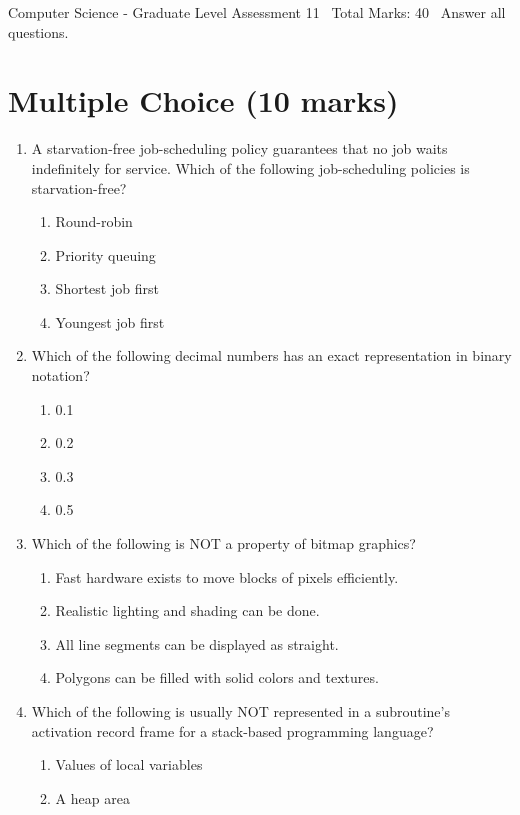 \documentclass[12pt]{article}
\begin{document}
\begin{center}
Computer Science - Graduate Level Assessment 11 \
Total Marks: 40 \
Answer all questions.
\end{center}

\section*{Multiple Choice (10 marks)}
\begin{enumerate}[label=\arabic*.]
\item A starvation-free job-scheduling policy guarantees that no job waits indefinitely for service. Which of the following job-scheduling policies is starvation-free?
\begin{enumerate}[label=(\alph*)]
    \item Round-robin
    \item Priority queuing
    \item Shortest job first
    \item Youngest job first
\end{enumerate}
\item Which of the following decimal numbers has an exact representation in binary notation?
\begin{enumerate}[label=(\alph*)]
    \item 0.1
    \item 0.2
    \item 0.3
    \item 0.5
\end{enumerate}
\item Which of the following is NOT a property of bitmap graphics?
\begin{enumerate}[label=(\alph*)]
    \item Fast hardware exists to move blocks of pixels efficiently.
    \item Realistic lighting and shading can be done.
    \item All line segments can be displayed as straight.
    \item Polygons can be filled with solid colors and textures.
\end{enumerate}
\item Which of the following is usually NOT represented in a subroutine's activation record frame for a stack-based programming language?
\begin{enumerate}[label=(\alph*)]
    \item Values of local variables
    \item A heap area

\end{enumerate}
\end{enumerate}
\end{document}
